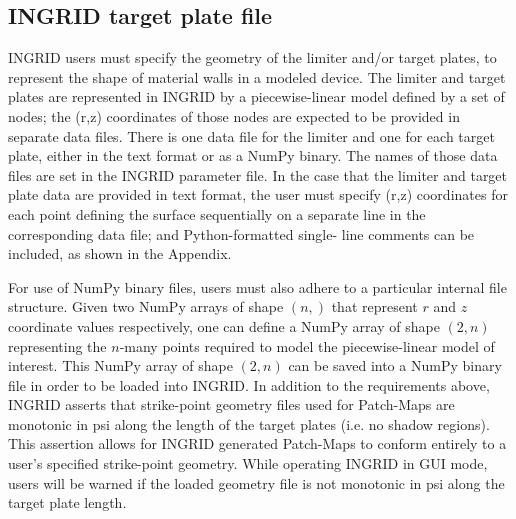 \subsection{INGRID target plate file}

INGRID users must specify the geometry of the limiter and/or target
plates, to represent the shape of material walls in a modeled
device. The limiter and target plates are represented in INGRID by a
piecewise-linear model defined by a set of nodes; the (r,z)
coordinates of those nodes are expected to be provided in separate
data files. There is one data file for the limiter and one for each
target plate, either in the text format or as a NumPy binary. The
names of those data files are set in the INGRID parameter file. In the
case that the limiter and target plate data are provided in text
format, the user must specify (r,z) coordinates for each point
defining the surface sequentially on a separate line in the
corresponding data file; and Python-formatted single- line comments
can be included, as shown in the Appendix.

For use of NumPy binary files, users must also adhere to a particular
internal file structure. Given two NumPy arrays of shape $(n, )$ that
represent $r$ and $z$ coordinate values respectively, one can define a
NumPy array of shape $(2,n)$ representing the $n$-many points required
to model the piecewise-linear model of interest. This NumPy array of
shape $(2, n)$ can be saved into a NumPy binary file in order to be
loaded into INGRID.  In addition to the requirements above, INGRID
asserts that strike-point geometry files used for Patch-Maps are
monotonic in psi along the length of the target plates (i.e. no shadow
regions). This assertion allows for INGRID generated Patch-Maps to
conform entirely to a user's specified strike-point geometry. While
operating INGRID in GUI mode, users will be warned if the loaded
geometry file is not monotonic in psi along the target plate length.
